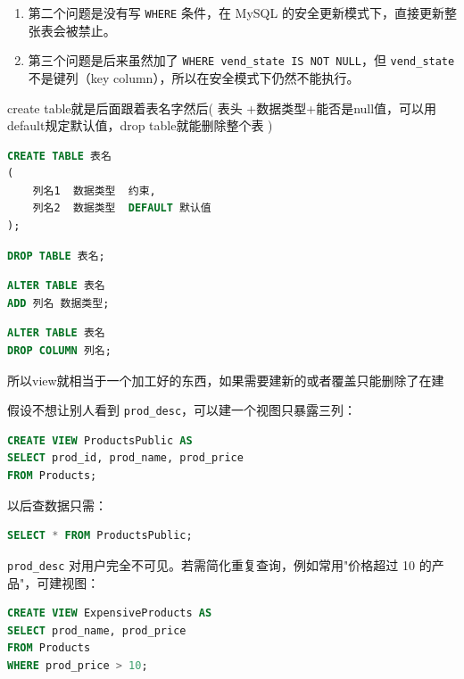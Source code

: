 \begin{example}
\begin{enumerate}
    \item 第二个问题是没有写 \texttt{WHERE} 条件，在 MySQL 的安全更新模式下，直接更新整张表会被禁止。

    \item 第三个问题是后来虽然加了 \texttt{WHERE vend\_state IS NOT NULL}，但 \texttt{vend\_state} 不是键列（key column），所以在安全模式下仍然不能执行。
\end{enumerate}
\begin{dxtips}
    create table就是后面跟着表名字然后(
    表头 +数据类型+能否是null值，可以用default规定默认值，drop table就能删除整个表
    )
\end{dxtips}
\begin{lstlisting}[language=SQL]
CREATE TABLE 表名
(
    列名1  数据类型  约束,
    列名2  数据类型  DEFAULT 默认值
);
\end{lstlisting}

\begin{lstlisting}[language=SQL]
DROP TABLE 表名;
\end{lstlisting}

\begin{lstlisting}[language=SQL]
ALTER TABLE 表名
ADD 列名 数据类型;
\end{lstlisting}

\begin{lstlisting}[language=SQL]
ALTER TABLE 表名
DROP COLUMN 列名;
\end{lstlisting}
\begin{dxtips}
    所以view就相当于一个加工好的东西，如果需要建新的或者覆盖只能删除了在建
\end{dxtips}
假设不想让别人看到 \texttt{prod\_desc}，可以建一个视图只暴露三列：

\begin{lstlisting}[language=SQL]
CREATE VIEW ProductsPublic AS
SELECT prod_id, prod_name, prod_price
FROM Products;
\end{lstlisting}

以后查数据只需：

\begin{lstlisting}[language=SQL]
SELECT * FROM ProductsPublic;
\end{lstlisting}

\texttt{prod\_desc} 对用户完全不可见。若需简化重复查询，例如常用"价格超过 10 的产品"，可建视图：

\begin{lstlisting}[language=SQL]
CREATE VIEW ExpensiveProducts AS
SELECT prod_name, prod_price
FROM Products
WHERE prod_price > 10;
\end{lstlisting}


\end{example}

